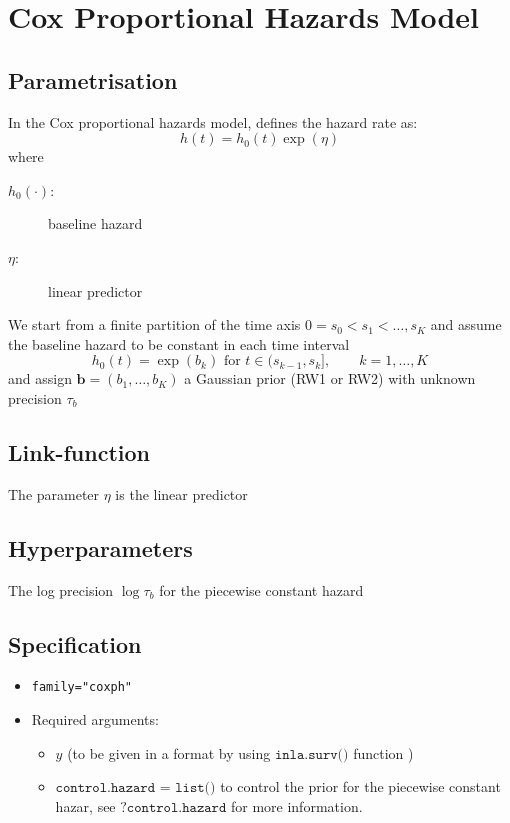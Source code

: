 \documentclass[a4paper,11pt]{article}
\begin{document}
\section*{Cox Proportional Hazards Model}

\subsection*{Parametrisation}

In the Cox proportional hazards model, defines the hazard rate as:
\begin{displaymath}
    h(t) = h_{0}(t)\exp(\eta)
\end{displaymath}
where
\begin{description}
\item[$h_{0}(\cdot)$:] baseline hazard
\item[$\eta$:] linear predictor
\end{description}

We start from a finite partition of the time axis
$0=s_{0}<s_{1}<\dots,s_{K}$ and assume the baseline hazard to be
constant in each time interval
\[
h_{0}(t) = \exp(b_{k})\mbox{ for }t\in(s_{k-1},s_{k}],\qquad
k=1,\dots,K
\]
and assign $\mathbf{b} = (b_{1},\dots,b_{K})$ a Gaussian prior (RW1 or
RW2) with unknown precision $\tau_{b}$
\subsection*{Link-function}

The parameter $\eta$ is the linear predictor

\subsection*{Hyperparameters}

The log precision $\log\tau_{b}$ for the piecewise constant hazard

\subsection*{Specification}

\begin{itemize}
\item \texttt{family="coxph"}
\item Required arguments:
    \begin{itemize}
    \item $y$ (to be given in a format by using $\texttt{inla.surv()}$
        function )
    \item $\texttt{control.hazard = list()}$ to control the prior for
        the piecewise constant hazar, see $\texttt{?control.hazard}$
        for more information.
    \end{itemize}
\end{itemize}
\end{document}
